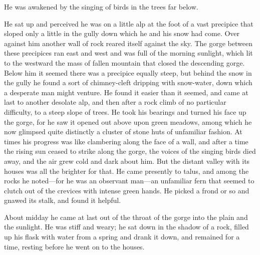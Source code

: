 \documentclass[courier]{sffms}
\begin{document}
He was awakened by the singing of birds in the trees far below.

He sat up and perceived he was on a little alp at the foot of a vast
precipice that sloped only a little in the gully down which he and his
snow had come. Over against him another wall of rock reared itself
against the sky. The gorge between these precipices ran east and west
and was full of the morning sunlight, which lit to the westward the
mass of fallen mountain that closed the descending gorge. Below him it
seemed there was a precipice equally steep, but behind the snow in the
gully he found a sort of chimney-cleft dripping with snow-water, down
which a desperate man might venture. He found it easier than it
seemed, and came at last to another desolate alp, and then after a
rock climb of no particular difficulty, to a steep slope of trees. He
took his bearings and turned his face up the gorge, for he saw it
opened out above upon green meadows, among which he now glimpsed quite
distinctly a cluster of stone huts of unfamiliar fashion. At times his
progress was like clambering along the face of a wall, and after a
time the rising sun ceased to strike along the gorge, the voices of
the singing birds died away, and the air grew cold and dark about him.
But the distant valley with its houses was all the brighter for
that. He came presently to talus, and among the rocks he noted---for he
was an observant man---an unfamiliar fern that seemed to clutch out of
the crevices with intense green hands. He picked a frond or so and
gnawed its stalk, and found it helpful.

About midday he came at last out of the throat of the gorge into the
plain and the sunlight. He was stiff and weary; he sat down in the
shadow of a rock, filled up his flask with water from a spring and
drank it down, and remained for a time, resting before he went on to
the houses.
\end{document}
